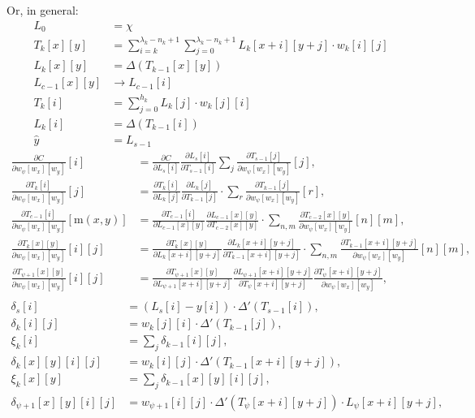 \documentclass[12pt]{article}
\newcommand{\deriv}[2]{\frac{\partial #1}{\partial #2}}
\newcommand{\imgsize}[1]{\lambda_{#1} - n_{#1} + 1}
\newcommand{\yhat}{\hat{y}}
\newcommand{\m}{\text{m}}
\begin{document}
\newpage
Or, in general:
\begin{align*}
	L_0 &= \chi \\
	T_k[x][y] &= \sum_{i=k}^{\imgsize{k}} \sum_{j=0}^{\imgsize{k}} L_k[x+i][y+j] \cdot w_k[i][j] \\
	L_k[x][y] &= \Delta(T_{k-1}[x][y]) \\
	L_{c-1}[x][y] &\rightarrow L_{c-1}[i] \\
	T_k[i] &= \sum_{j=0}^{h_k} L_k[j] \cdot w_k[j][i] \\
	L_k[i] &= \Delta(T_{k-1}[i]) \\
	\hat{y} &= L_{s-1}
\end{align*}
\begin{align*}
	\deriv{C}{w_\psi[w_x][w_y]} [i] &= \deriv{C}{L_s[i]} \deriv{L_s[i]}{T_{s-1}[i]} \sum_j \deriv{T_{s-1}[j]}{w_\psi[w_x][w_y]} [j], \\
	\deriv{T_k[i]}{w_\psi[w_x][w_y]} [j] &= \deriv{T_k[i]}{L_k[j]} \deriv{L_k[j]}{T_{k-1}[j]} \cdot \sum_r \deriv{T_{k-1}[j]}{w_\psi[w_x][w_y]} [r], \\
	\deriv{T_{c-1}[i]}{w_\psi[w_x][w_y]} [\m(x,y)] &= \deriv{T_{c-1}[i]}{L_{c-1}[x][y]} \deriv{L_{c-1}[x][y]}{T_{c-2}[x][y]} \cdot \sum_{n,m} \deriv{T_{c-2}[x][y]}{w_\psi[w_x][w_y]} [n][m], \\
	\deriv{T_k[x][y]}{w_\psi[w_x][w_y]} [i][j] &= \deriv{T_k[x][y]}{L_k[x+i][y+j]} \deriv{L_k[x+i][y+j]}{T_{k-1}[x+i][y+j]} \cdot \sum_{n,m} \deriv{T_{k-1}[x+i][y+j]}{w_\psi[w_x][w_y]} [n][m], \\
	\deriv{T_{\psi+1}[x][y]}{w_\psi[w_x][w_y]} [i][j] &= \deriv{T_{\psi+1}[x][y]}{L_{\psi+1}[x+i][y+j]} \deriv{L_{\psi+1}[x+i][y+j]}{T_\psi[x+i][y+j]} \deriv{T_\psi[x+i][y+j]}{w_\psi[w_x][w_y]}, \\
\end{align*}
\begin{align*}
	\delta_{s}[i] &= (L_s[i] - y[i]) \cdot \Delta '(T_{s-1}[i]) , \\
	\delta_k[i][j] &= w_k[j][i]  \cdot \Delta '(T_{k-1}[j]) , \\
	\xi_k[i] &= \sum_j \delta_{k-1} [i][j] , \\
	\delta_k[x][y][i][j] &= w_k[i][j]  \cdot \Delta '(T_{k-1}[x+i][y+j]), \\
	\xi_k[x][y] &= \sum_j \delta_{k-1}[x][y][i][j] , \\
	\delta_{\psi+1}[x][y][i][j] &= w_{\psi+1}[i][j]  \cdot \Delta '(T_\psi[x+i][y+j]) \cdot L_\psi[x+i][y+j], \\
\end{align*}
\end{document}
